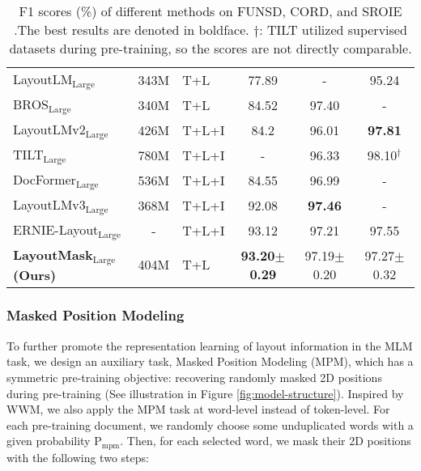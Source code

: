 \documentclass[11pt]{article}
\begin{document}
\begin{table*}
\begin{tabular}{l|c|l|ccc}
LayoutLM$_\mathrm{Large}$  \citep{xu2020layoutlm}    & 343M                  & T+L               & 77.89          &-               & 95.24          \\
BROS$_\mathrm{Large}$ \citep{hong2022bros}              & 340M                  & T+L               & 84.52          & 97.40          &-                \\
LayoutLMv2$_\mathrm{Large}$  \citep{xu2021layoutlmv2}        & 426M                  & T+L+I             & 84.2           & 96.01         & \textbf{97.81}          \\
TILT$_\mathrm{Large}$  \citep{powalski2021going}             & 780M                  & T+L+I             & -              & 96.33         & 98.10$^\dag$          \\
DocFormer$_\mathrm{Large}$  \citep{appalaraju2021docformer}        & 536M                  & T+L+I             & 84.55          & 96.99         &-                \\

LayoutLMv3$_\mathrm{Large}$  \citep{huang2022layoutlmv3}       & 368M                  & T+L+I             & 92.08          & \textbf{97.46}         & -               \\
ERNIE-Layout$_\mathrm{Large}$  \citep{peng2022ernie}    & -                     & T+L+I             & 93.12          & 97.21         & 97.55          \\ \hline
\textbf{LayoutMask$_\mathrm{Large}$ (Ours)} & 404M                   & T+L               & \textbf{93.20$\pm$0.29}     & 97.19$\pm$0.20    & 97.27$\pm$0.32     \\ \hline
\end{tabular}
\caption{\label{table:sota}
F1 scores (\%) of different methods on FUNSD, CORD, and SROIE .The best results are denoted in boldface. $\dag$: TILT utilized supervised datasets during pre-training, so the scores are not directly comparable.
}
\end{table*}

\subsubsection{Masked Position Modeling}
\label{sec:mpm}

To further promote the representation learning of layout information in the MLM task, we design an auxiliary task, Masked Position Modeling (MPM), which has a symmetric pre-training objective: recovering randomly masked 2D positions during pre-training (See illustration in Figure \ref{fig:model-structure}).
Inspired by WWM, we also apply the MPM task at word-level instead of token-level.
For each pre-training document, we randomly choose some unduplicated words with a given probability $\mathrm{P}_\mathrm{mpm}$.
Then, for each selected word, we mask their 2D positions with the following two steps:
\end{document}
